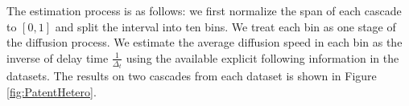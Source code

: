 The estimation process is as follows: we first normalize the span of each cascade to $[0,1]$ and split the interval into ten bins. We treat each bin as one stage of the diffusion process. We estimate the average diffusion speed in each bin as the inverse of delay time $\frac{1}{\Delta_t}$ using the available explicit following information in the datasets.  The results on two cascades from each dataset is shown in Figure \ref{fig:PatentHetero}. 
\begin{figure}[H]

\end{figure}
